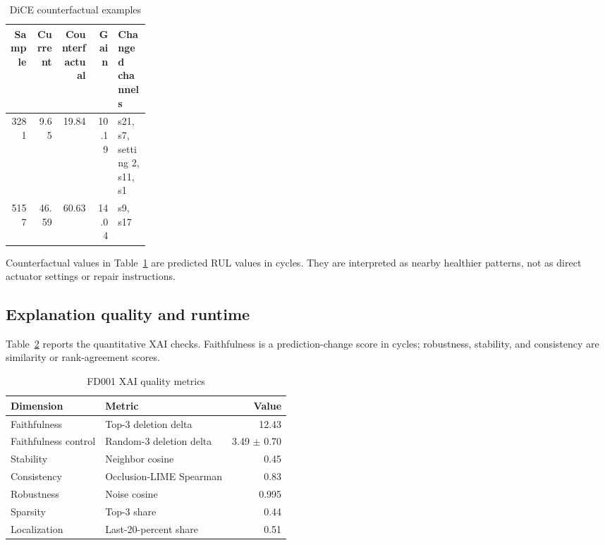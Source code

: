 \documentclass[conference]{IEEEtran}
\begin{document}
\begin{table}[!t]
\caption{DiCE counterfactual examples}
\label{tab:dice}
\centering
\scriptsize
\begin{tabular}{rrrrp{0.23\linewidth}}
\toprule
Sample & Current & Counterfactual & Gain & Changed channels \\
\midrule
3281 & 9.65 & 19.84 & 10.19 & s21, s7, setting 2, s11, s1 \\
5157 & 46.59 & 60.63 & 14.04 & s9, s17 \\
\bottomrule
\end{tabular}
\end{table}

Counterfactual values in Table~\ref{tab:dice} are predicted RUL values in cycles. They are interpreted as nearby healthier patterns, not as direct actuator settings or repair instructions.

\subsection{Explanation quality and runtime}
Table~\ref{tab:quality} reports the quantitative XAI checks. Faithfulness is a prediction-change score in cycles; robustness, stability, and consistency are similarity or rank-agreement scores.

\begin{table}[!t]
\caption{FD001 XAI quality metrics}
\label{tab:quality}
\centering
\scriptsize
\begin{tabular}{llr}
\toprule
Dimension & Metric & Value \\
\midrule
Faithfulness & Top-3 deletion delta & 12.43 \\
Faithfulness control & Random-3 deletion delta & 3.49 \(\pm\) 0.70 \\
Stability & Neighbor cosine & 0.45 \\
Consistency & Occlusion-LIME Spearman & 0.83 \\
Robustness & Noise cosine & 0.995 \\
Sparsity & Top-3 share & 0.44 \\
Localization & Last-20-percent share & 0.51 \\
\bottomrule
\end{tabular}
\end{table}
\end{document}

